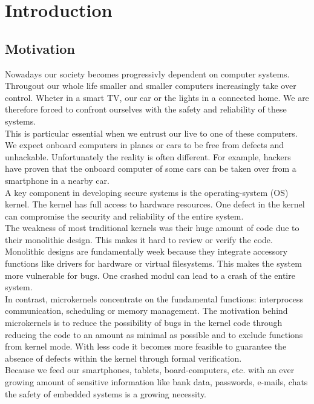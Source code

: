 \section{Introduction}
	\subsection{Motivation}
Nowadays our society becomes progressivly dependent on computer systems. Througout our whole life smaller and smaller computers increasingly take over control. Wheter in a smart TV, our car or the lights in a connected home. We are therefore forced to confront ourselves with the safety and reliability of these systems. \\
This is particular essential when we entrust our live to one of these computers. We expect onboard computers in planes or cars to be free from defects and unhackable. Unfortunately the reality is often different. For example, hackers have proven that the onboard computer of some cars can be taken over from a smartphone in a nearby car. \\
A key component in developing secure systems is the operating-system (OS) kernel. The kernel has full access to hardware resources. One defect in the kernel can compromise the security and reliability of the entire system. \\
The weakness of most traditional kernels was their huge amount of code due to their monolithic design. This makes it hard to review or verify the code. Monolithic designs are fundamentally week because they integrate accessory functions like drivers for hardware or virtual filesystems. This makes the system more vulnerable for bugs. One crashed modul can lead to a crash of the entire system. \\
In contrast, microkernels concentrate on the fundamental functions: interprocess communication, scheduling or memory management. The motivation behind microkernels is to reduce the  possibility of bugs in the kernel code through reducing the code to an amount as minimal as possible and to exclude functions from kernel mode. With less code it becomes more feasible to guarantee the absence of defects within the kernel through formal verification.\\
Because we feed our smartphones, tablets, board-computers, etc. with an ever growing amount of sensitive information like bank data, passwords, e-mails, chats the safety of embedded systems is a growing necessity. \\
